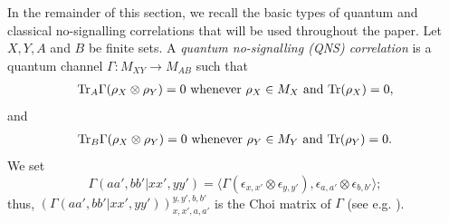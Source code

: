 \documentclass[11pt]{amsart}
\begin{document}
In the remainder of this section, we recall the basic types of quantum and classical no-signalling 
correlations that will be used throughout the paper.
Let $X, Y, A$ and $B$ be finite sets. 
A \textit{quantum no-signalling (QNS) correlation} \cite{dw} is a quantum channel 
$\Gamma: M_{XY}\rightarrow M_{AB}$ such that
\begin{gather}
	{\rm Tr}_{A}\Gamma(\rho_{X}\otimes \rho_{Y}) = 0 \text{ whenever } \rho_{X} \in M_{X} \text{ and } {\rm Tr}(\rho_{X}) = 0,
\end{gather}
\noindent and
\begin{gather}
	{\rm Tr}_{B}\Gamma(\rho_{X}\otimes \rho_{Y}) = 0 \text{ whenever } \rho_{Y} \in M_{Y} \text{ and } {\rm Tr}(\rho_{Y}) = 0.
\end{gather}
We set 
$$\Gamma(aa',bb'|xx',yy') = \langle \Gamma(\epsilon_{x,x'} \otimes \epsilon_{y,y'}),\epsilon_{a,a'} \otimes \epsilon_{b,b'}
\rangle;$$
thus, 
$(\Gamma(aa',bb'|xx',yy'))_{x,x',a,a'}^{y,y',b,b'}$ is the Choi matrix of $\Gamma$ (see e.g. \cite{pa}).
\end{document}
